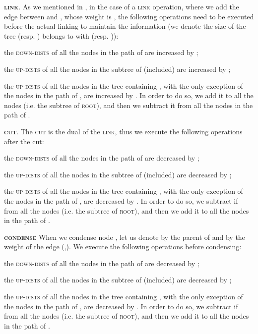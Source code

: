 \documentclass[a4paper,USenglish]{lipics}
\begin{document}
\noindent \textbf{\textsc{link}}. As we mentioned in , in the case of a \textsc{link} operation, where we add the edge between  and , whose weight is , the following operations need to be executed before the actual linking to maintain the information (we denote the size of the tree  (resp. ) belongs to with  (resp. )):
\begin{compactitem}
\item the \textsc{down-dists} of all the nodes in the path of  are increased by ;
\item the \textsc{up-dists} of all the nodes in the subtree of  (included) are increased by ;
\item the \textsc{up-dists} of all the nodes in the tree containing , with the only exception of the nodes in the path of , are increased by . In order to do so, we add it to all the nodes (i.e. the subtree of \textsc{root}), and then we subtract it from all the nodes in the path of . 
\end{compactitem}

	
\noindent	\textbf{\textsc{cut}}. The \textsc{cut} is the dual of the \textsc{link}, thus we execute the following operations after the cut:
\begin{compactitem}
\item the \textsc{down-dists} of all the nodes in the path of  are decreased by ;
\item the \textsc{up-dists} of all the nodes in the subtree of  (included) are decreased by ;
\item the \textsc{up-dists} of all the nodes in the tree containing , with the only exception of the nodes in the path of , are decreased by . In order to do so, we subtract if from all the nodes (i.e. the subtree of \textsc{root}), and then we add it to all the nodes in the path of . 
\end{compactitem}
		
\noindent	\textbf{\textsc{condense}}
When we condense node , let us denote by  the parent of  and by  the weight of the edge (,). We execute the following operations before condensing:
\begin{compactitem}
\item the \textsc{down-dists} of all the nodes in the path of  are decreased by ;
\item the \textsc{up-dists} of all the nodes in the subtree of  (included) are decreased by ;
\item the \textsc{up-dists} of all the nodes in the tree containing , with the only exception of the nodes in the path of , are decreased by . In order to do so, we subtract if from all the nodes (i.e. the subtree of \textsc{root}), and then we add it to all the nodes in the path of . 
\end{compactitem}
\end{document}
